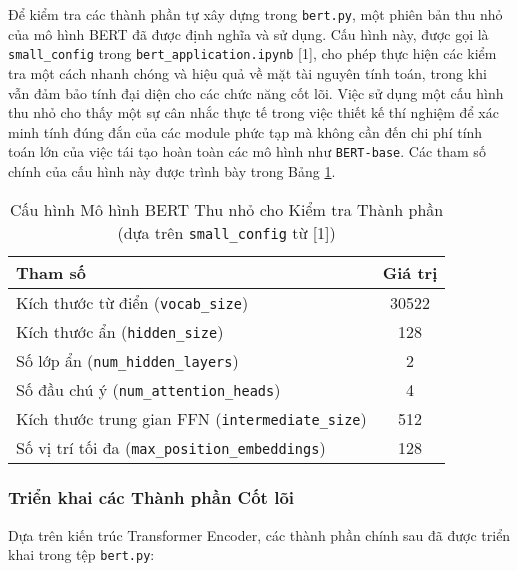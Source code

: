 Để kiểm tra các thành phần tự xây dựng trong \texttt{bert.py}, một phiên bản thu nhỏ của mô hình BERT đã được định nghĩa và sử dụng. Cấu hình này, được gọi là \texttt{small\_config} trong \texttt{bert\_application.ipynb} [1], cho phép thực hiện các kiểm tra một cách nhanh chóng và hiệu quả về mặt tài nguyên tính toán, trong khi vẫn đảm bảo tính đại diện cho các chức năng cốt lõi. Việc sử dụng một cấu hình thu nhỏ cho thấy một sự cân nhắc thực tế trong việc thiết kế thí nghiệm để xác minh tính đúng đắn của các module phức tạp mà không cần đến chi phí tính toán lớn của việc tái tạo hoàn toàn các mô hình như \texttt{BERT-base}. Các tham số chính của cấu hình này được trình bày trong Bảng \ref{tab:small_bert_config_rewrite}.

\begin{table}[H]
\centering
\caption{Cấu hình Mô hình BERT Thu nhỏ cho Kiểm tra Thành phần (dựa trên \texttt{small\_config} từ [1])}
\label{tab:small_bert_config_rewrite}
\begin{tabular}{lc}
\toprule
\textbf{Tham số} & \textbf{Giá trị} \\
\midrule
Kích thước từ điển (\texttt{vocab\_size}) & 30522 \\
Kích thước ẩn (\texttt{hidden\_size}) & 128 \\
Số lớp ẩn (\texttt{num\_hidden\_layers}) & 2 \\
Số đầu chú ý (\texttt{num\_attention\_heads}) & 4 \\
Kích thước trung gian FFN (\texttt{intermediate\_size}) & 512 \\
Số vị trí tối đa (\texttt{max\_position\_embeddings}) & 128 \\
\bottomrule
\end{tabular}
\end{table}

\subsubsection{Triển khai các Thành phần Cốt lõi}
\label{sssec:trien_khai_thanh_phan_cot_loi_rewrite}
Dựa trên kiến trúc Transformer Encoder, các thành phần chính sau đã được triển khai trong tệp \texttt{bert.py}:


